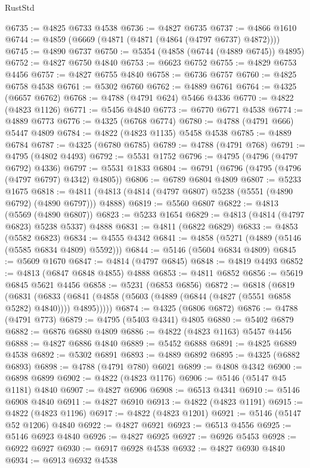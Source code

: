 \begin{lexlean}{RustStd}
\begin{coremodule}
@6735 := @4825 @6733 @4538
@6736 := @4827 @6735
@6737 := @4866 @1610
@6744 := @4859 (@6669 (@4871 (@4871 (@4864 (@4797 @6737) @4872))))
@6745 := @4890 @6737
@6750 := @5354 (@4858 (@6744 (@4889 @6745)) @4895)
@6752 := @4827 @6750 @4840
@6753 := @6623 @6752
@6755 := @4829 @6753 @4456
@6757 := @4827 @6755 @4840
@6758 := @6736 @6757
@6760 := @4825 @6758 @4538
@6761 := @5302 @6760
@6762 := @4889 @6761
@6764 := @4325 (@6657 @6762)
@6768 := @4788 (@4791 @624) @5466 @4336
@6770 := @4822 (@4823 @1126)
@6771 := @5456 @4840
@6773 := @6770 @6771 @4538
@6774 := @4889 @6773
@6776 := @4325 (@6768 @6774)
@6780 := @4788 (@4791 @666) @5447 @4809
@6784 := @4822 (@4823 @1135) @5458 @4538
@6785 := @4889 @6784
@6787 := @4325 (@6780 @6785)
@6789 := @4788 (@4791 @768)
@6791 := @4795 (@4802 @4493)
@6792 := @5531 @1752
@6796 := @4795 (@4796 (@4797 @6792) @4336)
@6797 := @5531 @1833
@6804 := @6791 (@6796 (@4795 (@4796 (@4797 @6797) @4342) @4805))
@6806 := @6789 @6804 @4809
@6807 := @5233 @1675
@6818 := @4811 (@4813 (@4814 (@4797 @6807) @5238 (@5551 (@4890 @6792) (@4890 @6797))) @4888)
@6819 := @5560 @6807
@6822 := @4813 (@5569 (@4890 @6807))
@6823 := @5233 @1654
@6829 := @4813 (@4814 (@4797 @6823) @5238 @5337) @4888
@6831 := @4811 (@6822 @6829)
@6833 := @4853 (@5582 @6823)
@6834 := @4555 @4342
@6841 := @4858 (@5271 (@4889 (@5146 (@5585 @6834 @4809) @5592)))
@6844 := @5146 (@5604 @6834 @4809)
@6845 := @5609 @1670
@6847 := @4814 (@4797 @6845)
@6848 := @4819 @4493
@6852 := @4813 (@6847 @6848 @4855) @4888
@6853 := @4811 @6852
@6856 := @5619 @6845 @5621 @4456
@6858 := @5231 (@6853 @6856)
@6872 := @6818
    (@6819
      (@6831
        (@6833 (@6841 (@4858 (@5603 (@4889 (@6844 (@4827 (@5551 @6858 @5282) @4840)))) @4895)))))
@6874 := @4325 (@6806 @6872)
@6876 := @4788 (@4791 @773)
@6879 := @4795 (@5403 @4341) @4805
@6880 := @5402 @6879
@6882 := @6876 @6880 @4809
@6886 := @4822 (@4823 @1163) @5457 @4456
@6888 := @4827 @6886 @4840
@6889 := @5452 @6888
@6891 := @4825 @6889 @4538
@6892 := @5302 @6891
@6893 := @4889 @6892
@6895 := @4325 (@6882 @6893)
@6898 := @4788 (@4791 @780) @6021
@6899 := @4808 @4342
@6900 := @6898 @6899
@6902 := @4822 (@4823 @1176)
@6906 := @5146 (@5147 @45 @1181) @4840
@6907 := @4827 @6906
@6908 := @6513 @4341
@6910 := @5146 @6908 @4840
@6911 := @4827 @6910
@6913 := @4822 (@4823 @1191)
@6915 := @4822 (@4823 @1196)
@6917 := @4822 (@4823 @1201)
@6921 := @5146 (@5147 @52 @1206) @4840
@6922 := @4827 @6921
@6923 := @6513 @4556
@6925 := @5146 @6923 @4840
@6926 := @4827 @6925
@6927 := @6926 @5453
@6928 := @6922 @6927
@6930 := @6917 @6928 @4538
@6932 := @4827 @6930 @4840
@6934 := @6913 @6932 @4538

\end{coremodule}
\end{lexlean}
